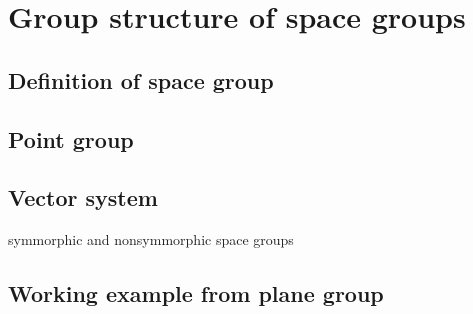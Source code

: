 \section{\label{sec:group_structure}Group structure of space groups}

\subsection{Definition of space group}

\subsection{Point group}

\subsection{Vector system}

symmorphic and nonsymmorphic space groups

\subsection{Working example from plane group}
